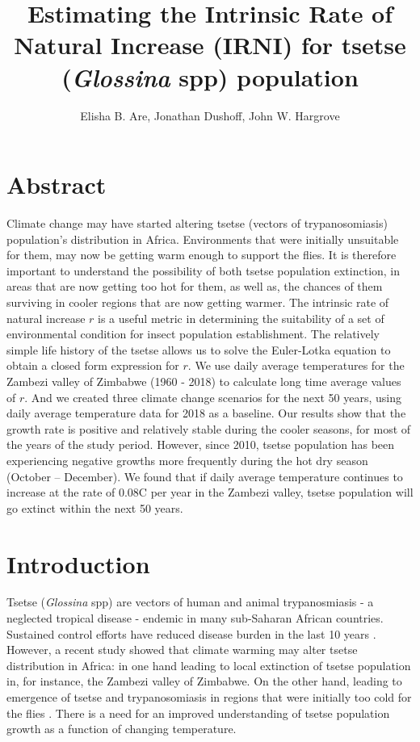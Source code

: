 \documentclass[10pt,a4paper]{article}
\author{Elisha B. Are, Jonathan Dushoff, John W. Hargrove}
\title{Estimating the Intrinsic Rate of Natural Increase (IRNI) for tsetse ({\it Glossina} spp) population}
\begin{document}
\maketitle

\section*{Abstract} 
Climate change may have started altering tsetse (vectors of trypanosomiasis) population’s distribution in Africa. Environments that were initially unsuitable for them, may now be getting warm enough to support the flies.  It is therefore important to understand the possibility of both tsetse population extinction, in areas that are now getting too hot for them, as well as, the chances of them surviving in cooler regions that are now getting warmer. The intrinsic rate of natural increase $r$ is a useful metric in determining the suitability of a set of environmental condition for insect population establishment.  The relatively simple life history of the tsetse allows us to solve the Euler-Lotka equation to obtain a closed form expression for $r$. We use daily average temperatures for the Zambezi valley of Zimbabwe (1960 - 2018) to calculate long time average values of $r$. And we created three climate change scenarios for the next 50 years, using daily average temperature data for 2018 as a baseline. Our results show that the growth rate is positive and relatively stable during the cooler seasons, for most of the years of the study period. However, since 2010, tsetse population has been experiencing negative growths more frequently during the hot dry season (October – December).  We found that if daily average temperature continues to increase at the rate of 0.08\degree C per year in the Zambezi valley, tsetse population will go extinct within the next 50 years.   



\section*{Introduction} 

Tsetse ({\it Glossina} spp) are vectors of human and animal trypanosmiasis - a neglected tropical disease - endemic in many sub-Saharan African countries. Sustained control efforts have reduced disease burden in the last 10 years \cite{WorldHealthOrganizationWHO2018}.  However, a recent study showed that climate warming may alter tsetse distribution in Africa: in one hand leading to local extinction of tsetse population in, for instance, the Zambezi valley of Zimbabwe. On the other hand, leading to emergence of tsetse and trypanosomiasis in regions that were initially too cold for the flies \cite{Lord2018}. There is a need for an improved understanding of tsetse population growth as a function of changing temperature.\\ 
\end{document}
